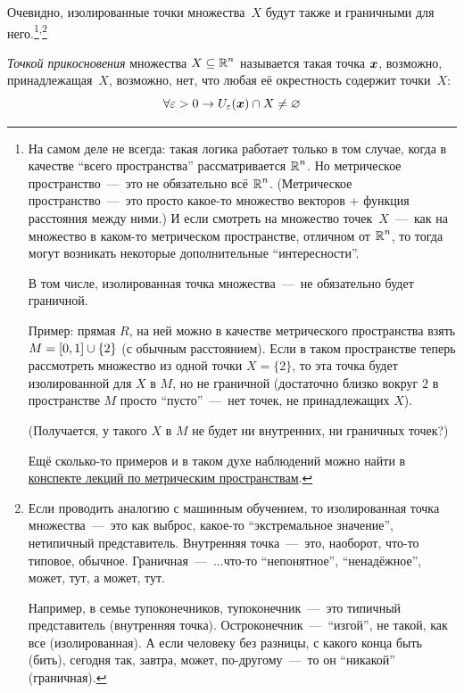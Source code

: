 \documentclass[a4paper,12pt]{article}
\begin{document}
  Очевидно, изолированные точки множества~$X$ будут также и граничными для него.\footnote{
    На самом деле не всегда: такая логика работает только в том случае, когда в качестве ``всего пространства'' рассматривается $\operatorname{\mathbb R}^n$.
    Но метрическое пространство~---~это не обязательно всё $\operatorname{\mathbb R}^n$.
    (Метрическое пространство~---~это просто какое-то множество векторов + функция расстояния между ними.)
    И если смотреть на множество точек~$X$~---~как на множество в каком-то метрическом пространстве, отличном от $\operatorname{\mathbb R}^n$, то тогда могут возникать некоторые дополнительные ``интересности''.

    В том числе, изолированная точка множества~---~не обязательно будет граничной.
    
    Пример: прямая $R$, на ней можно в качестве метрического пространства взять $M \hm= [0, 1] \hm\cup \{2\}$ (с обычным расстоянием).
    Если в таком пространстве теперь рассмотреть множество из одной точки $X = \{2\}$, то эта точка будет изолированной для $X$ в $M$, но не граничной (достаточно близко вокруг $2$ в пространстве $M$ просто ``пусто''~---~нет точек, не принадлежащих $X$).
    
    (Получается, у такого $X$ в $M$ не будет ни внутренних, ни граничных точек?)
    
    Ещё сколько-то примеров и в таком духе наблюдений можно найти в \href{http://math.phys.msu.ru/data/129/lec04a.pdf}{конспекте лекций по метрическим пространствам}.
  }\textsuperscript{,}\footnote{
    Если проводить аналогию с машинным обучением, то изолированная точка множества~---~это как выброс, какое-то ``экстремальное значение'', нетипичный представитель.
    Внутренняя точка~---~это, наоборот, что-то типовое, обычное.
    Граничная~---~...что-то ``непонятное'', ``ненадёжное'', может, тут, а может, тут.

    Например, в семье тупоконечников, тупоконечник~---~это типичный представитель (внутренняя точка).
    Остроконечник~---~``изгой'', не такой, как все (изолированная).
    А если человеку без разницы, с какого конца быть (бить), сегодня так, завтра, может, по-другому~---~то он ``никакой'' (граничная).
  }

  \begin{definition}\label{def:touch-point}
    \emph{Точкой прикосновения} множества $X \subseteq \operatorname{\mathbb R}^n$ называется такая точка $\boldsymbol x$, возможно, принадлежащая~$X$, возможно, нет, что любая её окрестность содержит точки~$X$:
    \[
      \forall \varepsilon > 0 \to U_{\varepsilon}(\boldsymbol x) \cap X \not= \varnothing
    \]
  \end{definition}
\end{document}
